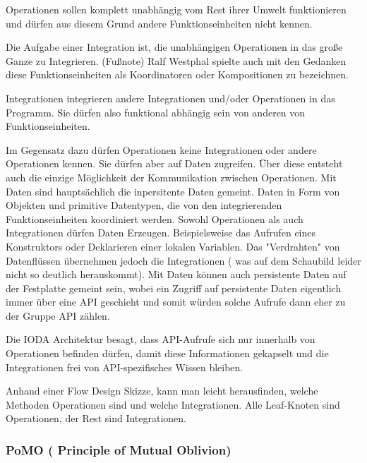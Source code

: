 Operationen sollen komplett unabhängig vom Rest ihrer Umwelt funktionieren und
dürfen aus diesem Grund andere Funktionseinheiten nicht kennen.

Die Aufgabe einer Integration ist, die unabhängigen Operationen in das große Ganze zu
Integrieren. 
(Fußnote) Ralf Westphal spielte auch mit den Gedanken diese Funktionseinheiten als Koordinatoren oder
Kompositionen zu bezeichnen.

Integrationen integrieren andere Integrationen und/oder Operationen in das Programm. Sie dürfen also funktional abhängig sein
von anderen von Funktionseinheiten.

Im Gegensatz dazu dürfen Operationen keine Integrationen oder andere Operationen
kennen. Sie dürfen aber auf Daten zugreifen. Über diese entsteht auch die einzige Möglichkeit der
Kommunikation zwischen Operationen. Mit Daten sind hauptsächlich die inpersitente
Daten gemeint. Daten in Form von Objekten und primitive Datentypen, die von den
integrierenden Funktionseinheiten koordiniert werden.
Sowohl Operationen als auch Integrationen dürfen Daten Erzeugen.
Beispielsweise das Aufrufen eines Konstruktors oder Deklarieren einer lokalen Variablen.
Das "Verdrahten" von Datenflüssen übernehmen jedoch die Integrationen ( was auf
dem Schaubild leider nicht so deutlich herauskommt). 
Mit Daten können auch persistente Daten auf der Festplatte gemeint sein, wobei
ein Zugriff auf persistente Daten eigentlich immer über eine API geschieht und
somit würden solche Aufrufe dann eher zu der Gruppe API zählen.

Die IODA Architektur besagt, dass API-Aufrufe sich nur innerhalb von Operationen befinden
dürfen, damit diese Informationen gekapselt und die Integrationen frei von API-spezifisches Wissen bleiben.


Anhand einer Flow Design Skizze, kann man leicht herausfinden, welche Methoden Operationen sind und welche
Integrationen. Alle Leaf-Knoten sind Operationen, der Rest sind Integrationen.


\subsubsection{PoMO ( Principle of Mutual Oblivion)}


\def\signed #1{{\leavevmode\unskip\nobreak\hfil\penalty50\hskip2em
		\hbox{}\nobreak\hfil(#1)%
		\parfillskip=0pt \finalhyphendemerits=0 \endgraf}}

\newsavebox\mybox
\newenvironment{aquote}[1]
{\savebox\mybox{#1}\begin{quote}}
	{\signed{\usebox\mybox}\end{quote}}

